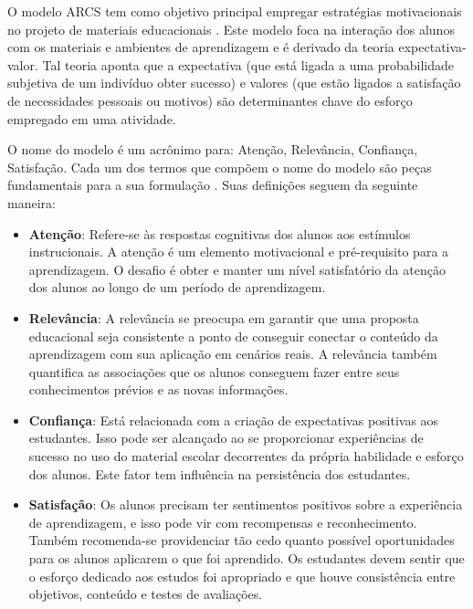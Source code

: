 O modelo \ac{ARCS} tem como objetivo principal empregar estratégias motivacionais no projeto de materiais educacionais \cite{keller1983development}. Este modelo foca na interação dos alunos com os materiais e ambientes de aprendizagem e é derivado da teoria expectativa-valor. Tal teoria aponta que a expectativa (que está ligada a uma probabilidade subjetiva de um indivíduo obter sucesso) e valores (que estão ligados a satisfação de necessidades pessoais ou motivos) são determinantes chave do esforço empregado em uma atividade. 

O nome do modelo é um acrônimo para: Atenção, Relevância, Confiança, Satisfação. Cada um dos termos que compõem o nome do modelo são peças fundamentais para a sua formulação \cite{keller1983development}. Suas definições seguem da seguinte maneira: 

\begin{itemize}[label={},leftmargin=2em]
\item \textbf{Atenção}: Refere-se às respostas cognitivas dos alunos aos estímulos instrucionais. A atenção é um elemento motivacional e pré-requisito para a aprendizagem. O desafio é obter e manter um nível satisfatório da atenção dos alunos ao longo de um período de aprendizagem.
\end{itemize}

\begin{itemize}[label={},leftmargin=2em]
\item \textbf{Relevância}: A relevância se preocupa em garantir que uma proposta educacional seja consistente a ponto de conseguir conectar o conteúdo da aprendizagem com sua aplicação em cenários reais. A relevância também quantifica as associações que os alunos conseguem fazer entre seus conhecimentos prévios e as novas informações.
\end{itemize}

\begin{itemize}[label={},leftmargin=2em]
\item \textbf{Confiança}: Está relacionada com a criação de expectativas positivas aos estudantes. Isso pode ser alcançado ao se proporcionar experiências de sucesso no uso do material escolar decorrentes da própria habilidade e esforço dos alunos. Este fator tem influência na persistência dos estudantes.
\end{itemize}

\begin{itemize}[label={},leftmargin=2em]
\item \textbf{Satisfação}: Os alunos precisam ter sentimentos positivos sobre a experiência de aprendizagem, e isso pode vir com recompensas e reconhecimento. Também recomenda-se providenciar tão cedo quanto possível oportunidades para os alunos aplicarem o que foi aprendido. Os estudantes devem sentir que o esforço dedicado aos estudos foi apropriado e que houve consistência entre objetivos, conteúdo e testes de avaliações.
\end{itemize}


